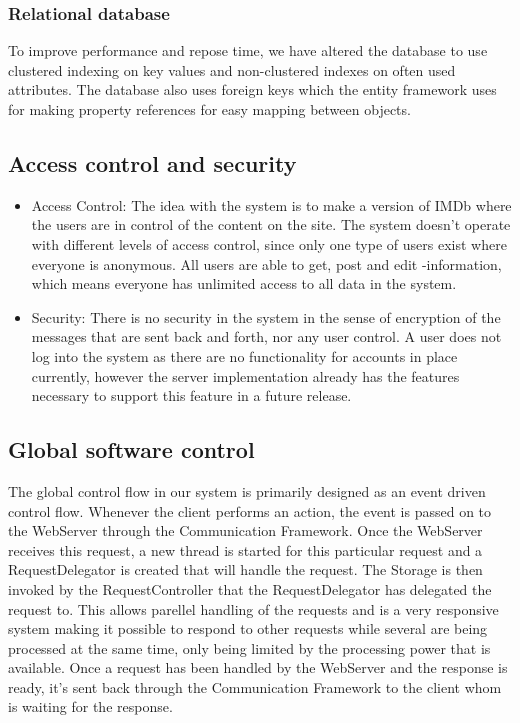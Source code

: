 \subsubsection{Relational database}
To improve performance and repose time, we have altered the database to use clustered indexing on key values and non-clustered indexes on often used attributes. The database also uses foreign keys which the entity framework uses for making property references for easy mapping between objects. 


\subsection{Access control and security}
\begin{itemize}
\item Access Control: The idea with the system is to make a version of IMDb where the users are in control of the content on the site. The system doesn't operate with different levels of access control, since only one type of users exist where everyone is anonymous. All users are able to get, post and edit -information, which means everyone has unlimited access to all data in the system.\\
\item Security: There is no security in the system in the sense of encryption of the messages that are sent back and forth, nor any user control. A user does not log into the system as there are no functionality for accounts in place currently, however the server implementation already has the features necessary to support this feature in a future release.
\end{itemize}

\subsection{Global software control}
The global control flow in our system is primarily designed as an event driven control flow. Whenever the client performs an action, the event is passed on to the WebServer through the Communication Framework. Once the WebServer receives this request, a new thread is started for this particular request and a RequestDelegator is created that will handle the request. The Storage is then invoked by the RequestController that the RequestDelegator has delegated the request to. This allows parellel handling of the requests and is a very responsive system making it possible to respond to other requests while several are being processed at the same time, only being limited by the processing power that is available. Once a request has been handled by the WebServer and the response is ready, it's sent back through the Communication Framework to the client whom is waiting for the response. 

